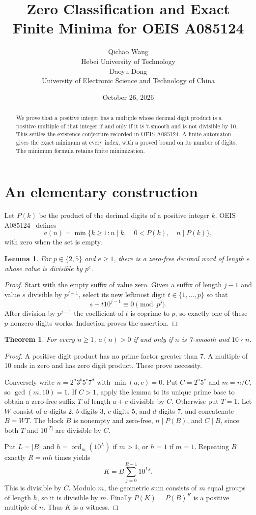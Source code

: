 \documentclass[10pt]{article}
\title{Zero Classification and Exact Finite Minima for OEIS A085124}
\author{Qichao Wang\\{\small Hebei University of Technology}\\[0.3em]
Daoyu Dong\\{\small University of Electronic Science and Technology of China}}
\date{October 26, 2026}
\newtheorem{theorem}{Theorem}
\newtheorem{lemma}{Lemma}
\begin{document}
\maketitle
\begin{abstract}
We prove that a positive integer has a multiple whose decimal digit product is a positive multiple of that integer if and only if it is 7-smooth and is not divisible by 10. This settles the existence conjecture recorded in OEIS A085124. A finite automaton gives the exact minimum at every index, with a proved bound on its number of digits. The minimum formula retains finite minimization.
\end{abstract}
\section{An elementary construction}
Let $P(k)$ be the product of the decimal digits of a positive integer $k$. OEIS A085124~\cite{oeis} defines
\[
 a(n)=\min\{k\ge1:n\mid k,\quad 0<P(k),\quad n\mid P(k)\},
\]
with zero when the set is empty.
\begin{lemma}
For $p\in\{2,5\}$ and $e\ge1$, there is a zero-free decimal word of length $e$ whose value is divisible by $p^e$.
\end{lemma}
\begin{proof}
Start with the empty suffix of value zero. Given a suffix of length $j-1$ and value $s$ divisible by $p^{j-1}$, select its new leftmost digit $t\in\{1,\ldots,p\}$ so that
\[
 s+t10^{j-1}\equiv0\pmod{p^j}.
\]
After division by $p^{j-1}$ the coefficient of $t$ is coprime to $p$, so exactly one of these $p$ nonzero digits works. Induction proves the assertion.
\end{proof}
\begin{theorem}
For every $n\ge1$, $a(n)>0$ if and only if $n$ is 7-smooth and $10\nmid n$.
\end{theorem}
\begin{proof}
A positive digit product has no prime factor greater than 7. A multiple of 10 ends in zero and has zero digit product. These prove necessity.

Conversely write $n=2^a3^b5^c7^d$ with $\min(a,c)=0$. Put $C=2^a5^c$ and $m=n/C$, so $\gcd(m,10)=1$. If $C>1$, apply the lemma to its unique prime base to obtain a zero-free suffix $T$ of length $a+c$ divisible by $C$. Otherwise put $T=1$. Let $W$ consist of $a$ digits 2, $b$ digits 3, $c$ digits 5, and $d$ digits 7, and concatenate $B=WT$. The block $B$ is nonempty and zero-free, $n\mid P(B)$, and $C\mid B$, since both $T$ and $10^{|T|}$ are divisible by $C$.

Put $L=|B|$ and $h=\operatorname{ord}_m(10^L)$ if $m>1$, or $h=1$ if $m=1$. Repeating $B$ exactly $R=mh$ times yields
\[
 K=B\sum_{j=0}^{R-1}10^{Lj}.
\]
This is divisible by $C$. Modulo $m$, the geometric sum consists of $m$ equal groups of length $h$, so it is divisible by $m$. Finally $P(K)=P(B)^R$ is a positive multiple of $n$. Thus $K$ is a witness.
\end{proof}
\end{document}
